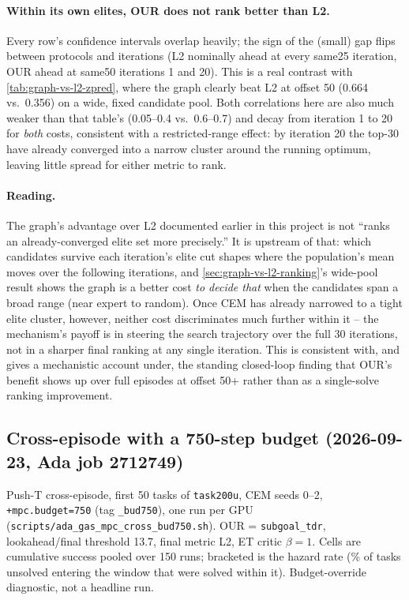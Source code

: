 \documentclass[11pt]{article}
\begin{document}
\paragraph{Within its own elites, OUR does not rank better than L2.} Every row's confidence
intervals overlap heavily; the sign of the (small) gap flips between protocols and iterations
(L2 nominally ahead at every same25 iteration, OUR ahead at same50 iterations 1 and 20). This
is a real contrast with \cref{tab:graph-vs-l2-zpred}, where the graph clearly beat L2 at
offset 50 (0.664 vs.\ 0.356) on a wide, fixed candidate pool. Both correlations here are also
much weaker than that table's (0.05--0.4 vs.\ 0.6--0.7) and decay from iteration 1 to 20 for
\emph{both} costs, consistent with a restricted-range effect: by iteration 20 the top-30 have
already converged into a narrow cluster around the running optimum, leaving little spread for
either metric to rank.

\paragraph{Reading.} The graph's advantage over L2 documented earlier in this project is not
``ranks an already-converged elite set more precisely.'' It is upstream of that: which
candidates survive each iteration's elite cut shapes where the population's mean moves over
the following iterations, and \cref{sec:graph-vs-l2-ranking}'s wide-pool result shows the
graph is a better cost \emph{to decide that} when the candidates span a broad range (near
expert to random). Once CEM has already narrowed to a tight elite cluster, however, neither
cost discriminates much further within it -- the mechanism's payoff is in steering the search
trajectory over the full 30 iterations, not in a sharper final ranking at any single
iteration. This is consistent with, and gives a mechanistic account under, the standing
closed-loop finding that OUR's benefit shows up over full episodes at offset 50+ rather than
as a single-solve ranking improvement.

\subsection{Cross-episode with a 750-step budget (2026-09-23, Ada job 2712749)}

Push-T cross-episode, first 50 tasks of \texttt{task200u}, CEM seeds 0--2, \texttt{+mpc.budget=750}
(tag \texttt{\_bud750}), one run per GPU (\texttt{scripts/ada\_gas\_mpc\_cross\_bud750.sh}). OUR =
\texttt{subgoal\_tdr}, lookahead/final threshold 13.7, final metric L2, ET critic $\beta=1$. Cells
are cumulative success pooled over 150 runs; bracketed is the hazard rate (\% of tasks unsolved
entering the window that were solved within it). Budget-override diagnostic, not a headline run.
\end{document}
